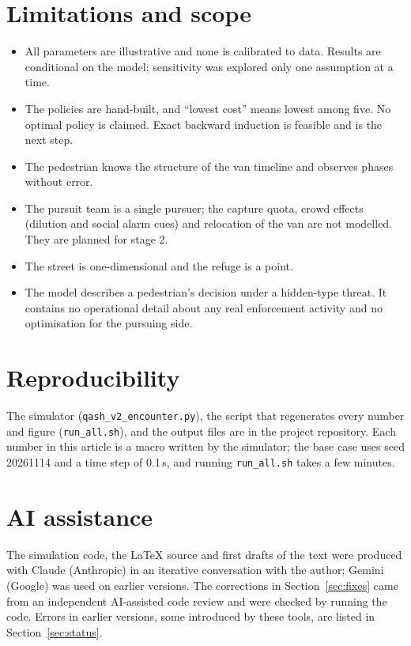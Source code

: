 \documentclass[11pt,a4paper]{article}
\begin{document}
\section{Limitations and scope}
\begin{itemize}
  \item All parameters are illustrative and none is calibrated to data. Results are conditional on the model; sensitivity was explored only one assumption at a time.
  \item The policies are hand-built, and ``lowest cost'' means lowest among five. No optimal policy is claimed. Exact backward induction is feasible and is the next step.
  \item The pedestrian knows the structure of the van timeline and observes phases without error.
  \item The pursuit team is a single pursuer; the capture quota, crowd effects (dilution and social alarm cues) and relocation of the van are not modelled. They are planned for stage 2.
  \item The street is one-dimensional and the refuge is a point.
  \item The model describes a pedestrian's decision under a hidden-type threat. It contains no operational detail about any real enforcement activity and no optimisation for the pursuing side.
\end{itemize}

\section{Reproducibility}
The simulator (\texttt{qash\_v2\_encounter.py}), the script that regenerates every number and figure (\texttt{run\_all.sh}), and the output files are in the project repository.
Each number in this article is a macro written by the simulator; the base case uses seed 20261114 and a time step of 0.1\,s, and running \texttt{run\_all.sh} takes a few minutes.

\section*{AI assistance}
The simulation code, the \LaTeX{} source and first drafts of the text were produced with Claude (Anthropic) in an iterative conversation with the author; Gemini (Google) was used on earlier versions. The corrections in Section~\ref{sec:fixes} came from an independent AI-assisted code review and were checked by running the code. Errors in earlier versions, some introduced by these tools, are listed in Section~\ref{sec:status}.
\end{document}

